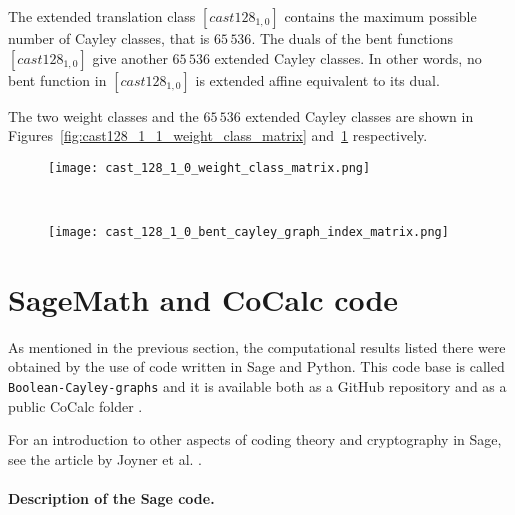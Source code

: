 \documentclass[12pt,a4paper]{article}
\begin{document}
The extended translation class $[cast128_{1,0}]$ contains the maximum possible number of Cayley classes,
that is $65\,536$.
The duals of the bent functions $[cast128_{1,0}]$ give another $65\,536$ extended Cayley classes.
In other words, no bent function in $[cast128_{1,0}]$ is extended affine equivalent to its dual.

The two weight classes and the $65\,536$ extended Cayley classes are
shown in Figures~\ref{fig:cast128_1_1_weight_class_matrix} and~\ref{fig:cast_128_1_1_bent_cayley_graph_index_matrix} respectively.

\begin{figure}
\centering
\begin{minipage}{.48\textwidth}
  \centering

\texttt{[image: cast\_128\_1\_0\_weight\_class\_matrix.png]}
  \label{fig:cast128_1_1_weight_class_matrix}
\end{minipage}
~~
\begin{minipage}{.48\textwidth}
  \centering
\texttt{[image: cast\_128\_1\_0\_bent\_cayley\_graph\_index\_matrix.png]}
  \label{fig:cast_128_1_1_bent_cayley_graph_index_matrix}
\end{minipage}%
\end{figure}

\section{SageMath and CoCalc code}
\label{sec-Code}
As mentioned in the previous section, the computational results listed there were obtained by the
use of code written in Sage \cite{JoyEtAl13Sage} \cite{SageMath7517} and Python.
This code base is called \texttt{Boolean-Cayley-graphs} and it is available both as a GitHub
repository \cite{Leo16GitHub} and as a public CoCalc \cite{SageMathCloud} folder
\cite{Leo16SMC}.

For an introduction to other aspects of coding theory and cryptography in Sage,
see the article by Joyner et al. \cite{JoyEtAl13Sage}.

\paragraph*{Description of the Sage code.}
\end{document}

